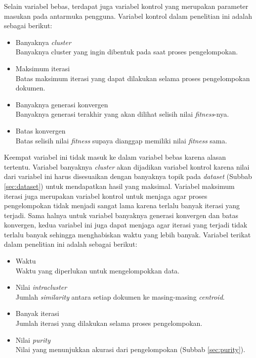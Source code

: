 Selain variabel bebas, terdapat juga variabel kontrol yang merupakan parameter masukan pada antarmuka pengguna. Variabel kontrol dalam penelitian ini adalah sebagai berikut:

\begin{itemize}
	\item Banyaknya \textit{cluster} \\
	Banyaknya cluster yang ingin dibentuk pada saat proses pengelompokan.
	\item Maksimum iterasi \\
	Batas maksimum iterasi yang dapat dilakukan selama proses pengelompokan dokumen.
	\item Banyaknya generasi konvergen \\
	Banyaknya generasi terakhir yang akan dilihat selisih nilai \textit{fitness}-nya.
	\item Batas konvergen \\
	Batas selisih nilai \textit{fitness} supaya dianggap memiliki nilai \textit{fitness} sama.
\end{itemize}

Keempat variabel ini tidak masuk ke dalam variabel bebas karena alasan tertentu. Variabel banyaknya \textit{cluster} akan dijadikan variabel kontrol karena nilai dari variabel ini harus disesuaikan dengan banyaknya topik pada \textit{dataset} (Subbab \ref{sec:dataset}) untuk mendapatkan hasil yang maksimal. Variabel maksimum iterasi juga merupakan variabel kontrol untuk menjaga agar proses pengelompokan tidak menjadi sangat lama karena terlalu banyak iterasi yang terjadi. Sama halnya untuk variabel banyaknya generasi konvergen dan batas konvergen, kedua variabel ini juga dapat menjaga agar iterasi yang terjadi tidak terlalu banyak sehingga menghabiskan waktu yang lebih banyak. Variabel terikat dalam penelitian ini adalah sebagai berikut:

\begin{itemize}
	\item Waktu \\
	Waktu yang diperlukan untuk mengelompokkan data.
	\item Nilai \textit{intracluster} \\
	Jumlah \textit{similarity} antara setiap dokumen ke masing-masing \textit{centroid}.
	\item Banyak iterasi \\
	Jumlah iterasi yang dilakukan selama proses pengelompokan.
	\item Nilai \textit{purity} \\
	Nilai yang menunjukkan akurasi dari pengelompokan (Subbab \ref{sec:purity}).
\end{itemize}


